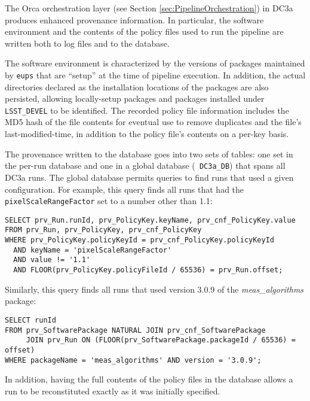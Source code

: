 
The Orca orchestration layer (see Section
\ref{sec:PipelineOrchestration}) in DC3a produces enhanced provenance
information.  In particular, the software environment and the contents
of the policy files used to run the pipeline are written both to log
files and to the database.

The software environment is characterized by the versions of packages
maintained by {\tt eups} that are ``setup'' at the time of pipeline
execution.  In addition, the actual directories declared as the
installation locations of the packages are also persisted, allowing
locally-setup packages and packages installed under {\tt LSST\_DEVEL} to
be identified.  The recorded policy file information includes the MD5
hash of the file contents for eventual use to remove duplicates and the
file's last-modified-time, in addition to the policy file's contents on
a per-key basis.

The provenance written to the database goes into two sets of tables: one
set in the per-run database and one in a global database ({\tt
DC3a\_DB}) that spans all DC3a runs.  The global database permits
queries to find runs that used a given configuration.  For example, this
query finds all runs that had the {\tt pixelScaleRangeFactor} set to a
number other than 1.1:

\begin{verbatim}
SELECT prv_Run.runId, prv_PolicyKey.keyName, prv_cnf_PolicyKey.value
FROM prv_Run, prv_PolicyKey, prv_cnf_PolicyKey
WHERE prv_PolicyKey.policyKeyId = prv_cnf_PolicyKey.policyKeyId
  AND keyName = 'pixelScaleRangeFactor'
  AND value != '1.1'
  AND FLOOR(prv_PolicyKey.policyFileId / 65536) = prv_Run.offset;
\end{verbatim}

Similarly, this query finds all runs that used version 3.0.9 of the {\it
meas\_algorithms} package:

\begin{verbatim}
SELECT runId
FROM prv_SoftwarePackage NATURAL JOIN prv_cnf_SoftwarePackage
     JOIN prv_Run ON (FLOOR(prv_SoftwarePackage.packageId / 65536) = offset)
WHERE packageName = 'meas_algorithms' AND version = '3.0.9';
\end{verbatim}

In addition, having the full contents of the policy files in the
database allows a run to be reconstituted exactly as it was initially
specified.
